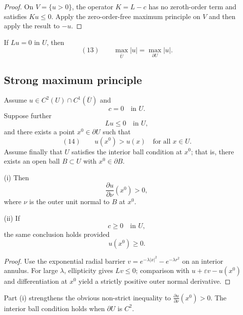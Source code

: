 \begin{proof}
\sketch On $V=\{u>0\}$, the operator $K=L-c$ has no zeroth-order term and satisfies $Ku\le0$. Apply the zero-order-free maximum principle on $V$ and then apply the result to $-u$.
\end{proof}

\begin{remark}
\label{rem:weak-maximum-principle-absolute-value}
If $Lu=0$ in $U$, then
$$(13) \qquad \max_{\bar U}|u| = \max_{\partial U}|u|.$$
\end{remark}

\subsection{Strong maximum principle}

\begin{lemma}
\label{lem:hopfs-lemma}
Assume $u \in C^2(U) \cap C^1(\bar U)$ and
$$c = 0 \quad \text{in } U.$$
Suppose further
$$Lu \leq 0 \quad \text{in } U,$$
and there exists a point $x^0 \in \partial U$ such that
$$(14) \qquad u(x^0) > u(x) \quad \text{for all } x \in U.$$
Assume finally that $U$ satisfies the interior ball condition at $x^0$; that is, there exists an open ball $B \subset U$ with $x^0 \in \partial B$.

(i) Then
$$\frac{\partial u}{\partial\nu}(x^0) > 0,$$
where $\nu$ is the outer unit normal to $B$ at $x^0$.

(ii) If
$$c \geq 0 \quad \text{in } U,$$
the same conclusion holds provided
$$u(x^0) \geq 0.$$
\end{lemma}

\begin{proof}
\sketch Use the exponential radial barrier $v=e^{-\lambda|x|^2}-e^{-\lambda r^2}$ on an interior annulus. For large $\lambda$, ellipticity gives $Lv\le0$; comparison with $u+\varepsilon v-u(x^0)$ and differentiation at $x^0$ yield a strictly positive outer normal derivative.
\end{proof}

\begin{remark}
\label{rem:hopfs-lemma-strict-inequality}
Part (i) strengthens the obvious non-strict inequality to $\frac{\partial u}{\partial\nu}(x^0)>0$. The interior ball condition holds when $\partial U$ is $C^2$.
\end{remark}

